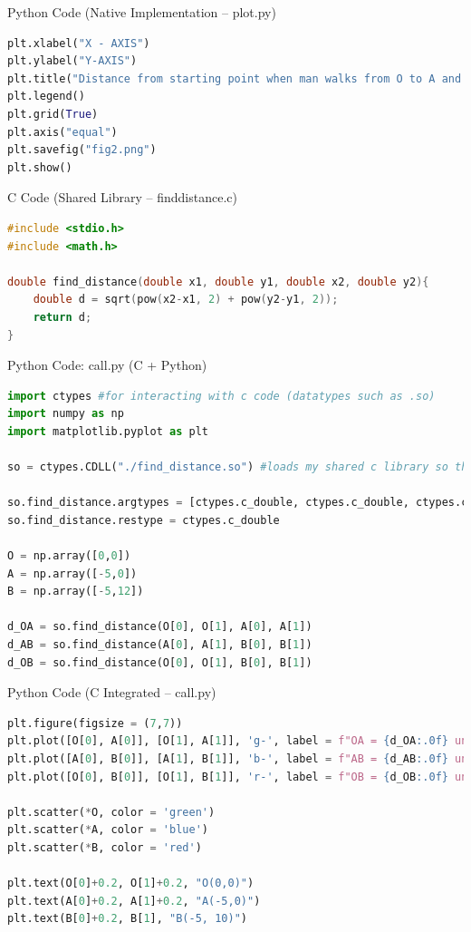 \documentclass{beamer}
\begin{document}
\begin{frame}[fragile]{Python Code (Native Implementation – plot.py)}
\begin{lstlisting}[language=Python]
plt.xlabel("X - AXIS")
plt.ylabel("Y-AXIS")
plt.title("Distance from starting point when man walks from O to A and from A to B")
plt.legend()
plt.grid(True)
plt.axis("equal")
plt.savefig("fig2.png")
plt.show()
\end{lstlisting}
\end{frame}

\begin{frame}[fragile]{C Code (Shared Library – finddistance.c)}
\begin{lstlisting}[language=C]
#include <stdio.h>
#include <math.h>

double find_distance(double x1, double y1, double x2, double y2){
    double d = sqrt(pow(x2-x1, 2) + pow(y2-y1, 2));
    return d;
}
\end{lstlisting}
\end{frame}

\begin{frame}[fragile]{Python Code: call.py (C + Python)}
\begin{lstlisting}[language=Python]
import ctypes #for interacting with c code (datatypes such as .so)
import numpy as np
import matplotlib.pyplot as plt

so = ctypes.CDLL("./find_distance.so") #loads my shared c library so that python can use it

so.find_distance.argtypes = [ctypes.c_double, ctypes.c_double, ctypes.c_double, ctypes.c_double]
so.find_distance.restype = ctypes.c_double

O = np.array([0,0])
A = np.array([-5,0])
B = np.array([-5,12])

d_OA = so.find_distance(O[0], O[1], A[0], A[1])
d_AB = so.find_distance(A[0], A[1], B[0], B[1])
d_OB = so.find_distance(O[0], O[1], B[0], B[1])
\end{lstlisting}
\end{frame}

\begin{frame}[fragile]{Python Code (C Integrated – call.py)
}
\begin{lstlisting}[language=Python]
plt.figure(figsize = (7,7))
plt.plot([O[0], A[0]], [O[1], A[1]], 'g-', label = f"OA = {d_OA:.0f} units")
plt.plot([A[0], B[0]], [A[1], B[1]], 'b-', label = f"AB = {d_AB:.0f} units")
plt.plot([O[0], B[0]], [O[1], B[1]], 'r-', label = f"OB = {d_OB:.0f} units")

plt.scatter(*O, color = 'green')
plt.scatter(*A, color = 'blue')
plt.scatter(*B, color = 'red')

plt.text(O[0]+0.2, O[1]+0.2, "O(0,0)")
plt.text(A[0]+0.2, A[1]+0.2, "A(-5,0)")
plt.text(B[0]+0.2, B[1], "B(-5, 10)")
\end{lstlisting}
\end{frame}
\end{document}
